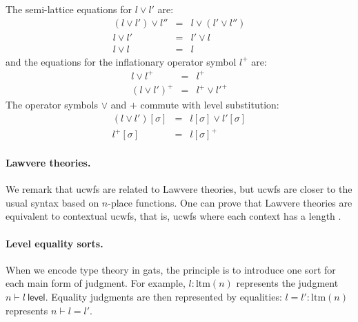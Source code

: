 \documentclass[11pt,a4paper]{article}
\theoremstyle{plain}
\theoremstyle{definition}
\newcommand{\level}{\mathsf{level}}
\def\ltm{\mathrm{ltm}}
\begin{document}
The semi-lattice equations for $l \vee l'$ are:
\begin{eqnarray*}
(l \vee l') \vee l'' &=& l \vee (l' \vee l'')\\
l \vee l' &=& l'\vee l\\
l \vee l &=& l
\end{eqnarray*}
and the equations for the inflationary operator symbol $l^+$ are:
\begin{eqnarray*}
l \vee l^+ &=& l^+\\
(l\vee l')^+ &=& l^+\vee l'^+
\end{eqnarray*}
The operator symbols $\vee$ and $+$ commute with level substitution:
\begin{eqnarray*}
(l \vee l')[\sigma] &=& l[\sigma] \vee l' [\sigma]\\
 l^+[\sigma] &=&  l[\sigma]^+
\end{eqnarray*}
\paragraph{Lawvere theories.} We remark that ucwfs are related to Lawvere theories, but ucwfs are closer to the usual syntax based on $n$-place functions. One can prove that Lawvere theories are equivalent to contextual ucwfs, that is, ucwfs where each context has a length \cite{ClairambaultD11,castellan:lambek}.

\paragraph{Level equality sorts.}
When we encode type theory in gats, the principle is to introduce one sort for each main form of judgment. For example, $l : \ltm(n)$ represents the judgment $n \vdash l\ \level$. Equality judgments are then represented by equalities: $l = l' : \ltm(n)$ represents $n \vdash l = l'$.
\end{document}

